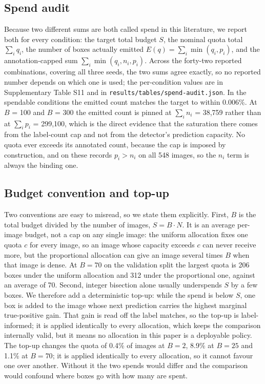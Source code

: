 \documentclass[sn-mathphys,Numbered]{sn-jnl}
\begin{document}
\subsection{Spend audit}

Because two different sums are both called spend in this literature, we report both for every condition: the target total budget $S$, the nominal quota total $\sum_i q_i$, the number of boxes actually emitted $E(q) = \sum_i \min(q_i, p_i)$, and the annotation-capped sum $\sum_i \min(q_i, n_i, p_i)$. Across the forty-two reported combinations, covering all three seeds, the two sums agree exactly, so no reported number depends on which one is used; the per-condition values are in Supplementary Table S11 and in \texttt{results/tables/spend-audit.json}. In the spendable conditions the emitted count matches the target to within 0.006\%. At $B$ = 100 and $B$ = 300 the emitted count is pinned at $\sum_i n_i$ = 38,759 rather than at $\sum_i p_i$ = 299,100, which is the direct evidence that the saturation there comes from the label-count cap and not from the detector's prediction capacity. No quota ever exceeds its annotated count, because the cap is imposed by construction, and on these records $p_i > n_i$ on all 548 images, so the $n_i$ term is always the binding one.

\subsection{Budget convention and top-up}

Two conventions are easy to misread, so we state them explicitly. First, $B$ is the total budget divided by the number of images, $S = B\cdot{}N$. It is an average per-image budget, not a cap on any single image: the uniform allocation fixes one quota $c$ for every image, so an image whose capacity exceeds $c$ can never receive more, but the proportional allocation can give an image several times $B$ when that image is dense. At $B = 70$ on the validation split the largest quota is 206 boxes under the uniform allocation and 312 under the proportional one, against an average of 70. Second, integer bisection alone usually underspends $S$ by a few boxes. We therefore add a deterministic top-up: while the spend is below $S$, one box is added to the image whose next prediction carries the highest marginal true-positive gain. That gain is read off the label matches, so the top-up is label-informed; it is applied identically to every allocation, which keeps the comparison internally valid, but it means no allocation in this paper is a deployable policy. The top-up changes the quota of 0.4\% of images at $B = 2$, 8.9\% at $B = 25$ and 1.1\% at $B = 70$; it is applied identically to every allocation, so it cannot favour one over another. Without it the two spends would differ and the comparison would confound where boxes go with how many are spent.
\end{document}
